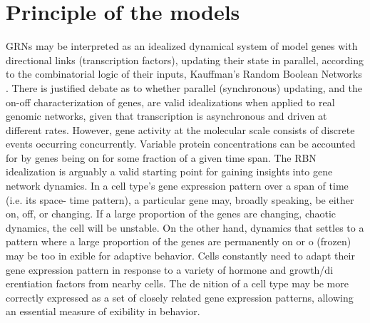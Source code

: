 \section{Principle of the models}
GRNs may be interpreted as an idealized dynamical system of
model genes with directional links (transcription factors), updating
their state in parallel, according to the combinatorial logic of their
inputs, Kauffman's Random Boolean Networks \cite{K1}\cite{K7}.
There is justified debate as to whether parallel (synchronous) updating,
and the on-off characterization of genes, are valid idealizations when applied
to real genomic networks, given that transcription is asynchronous and driven
at different rates. However, gene activity at the molecular scale consists of
discrete events occurring concurrently. Variable protein concentrations can be
accounted for by genes being on for some fraction of a given time span. The
RBN idealization is arguably a valid starting point for gaining insights into
gene network dynamics.
In a cell type's gene expression pattern over a span of time (i.e. its space-
time pattern), a particular gene may, broadly speaking, be either on, off, or
changing. If a large proportion of the genes are changing, chaotic dynamics, the cell will be unstable. On the other hand, dynamics that settles to
a pattern where a large proportion of the genes are permanently on or o
(frozen) may be too in exible for adaptive behavior. Cells constantly need to
adapt their gene expression pattern in response to a variety of hormone and
growth/di erentiation factors from nearby cells. The de nition of a cell type
may be more correctly expressed as a set of closely related gene expression
patterns, allowing an essential measure of exibility in behavior.

